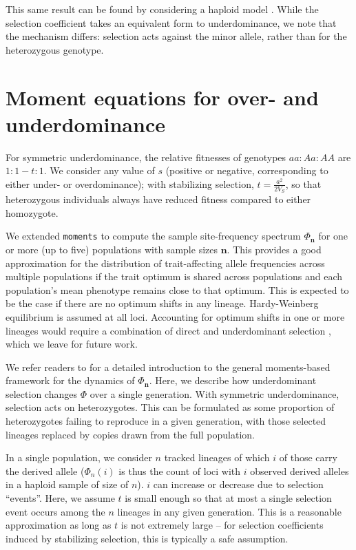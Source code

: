 \documentclass{article}
\newcommand{\moments}{\texttt{moments}\xspace}
\begin{document}
This same result can be found by considering a haploid model
\citep{negm2024effect}. While the selection coefficient takes an equivalent
form to underdominance, we note that the mechanism differs: selection acts
against the minor allele, rather than for the heterozygous genotype.

\section{Moment equations for over- and underdominance}
\label{sec:moments-underdominance}

For symmetric underdominance, the relative fitnesses of genotypes \(aa:Aa:AA\)
are \(1:1-t:1\). We consider any value of $s$ (positive or negative,
corresponding to either under- or overdominance); with stabilizing selection,
\(t=\frac{a^2}{2V_S}\), so that heterozygous individuals always have reduced
fitness compared to either homozygote.

We extended \moments \citep{jouganous2017inferring} to compute the sample
site-frequency spectrum \(\Phi_{\mathbf{n}}\) for one or more (up to five)
populations with sample sizes \(\mathbf{n}\). This provides a good
approximation for the distribution of trait-affecting allele frequencies across
multiple populations if the trait optimum is shared across populations and each
population's mean phenotype remains close to that optimum. This is expected to
be the case if there are no optimum shifts in any lineage.  Hardy-Weinberg
equilibrium is assumed at all loci. Accounting for optimum shifts in one or
more lineages would require a combination of direct and underdominant selection
\citep[e.g.,][]{hayward2022polygenic}, which we leave for future work.

We refer readers to \citet{jouganous2017inferring} for a detailed introduction
to the general moments-based framework for the dynamics of \(\Phi_\mathbf{n}\).
Here, we describe how underdominant selection changes \(\Phi\) over a single
generation. With symmetric underdominance, selection acts on heterozygotes. This
can be formulated as some proportion of heterozygotes failing to reproduce in a
given generation, with those selected lineages replaced by copies drawn from
the full population.

In a single population, we consider $n$ tracked lineages of which $i$ of those
carry the derived allele (\(\Phi_n(i)\) is thus the count of loci with $i$
observed derived alleles in a haploid sample of size of $n$). $i$ can increase
or decrease due to selection ``events''. Here, we assume $t$ is small enough so
that at most a single selection event occurs among the $n$ lineages in any
given generation. This is a reasonable approximation as long as $t$ is not
extremely large \citep{jouganous2017inferring, krukov2021taming} -- for
selection coefficients induced by stabilizing selection, this is typically a
safe assumption.
\end{document}
